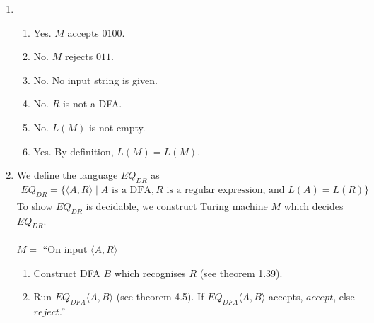 \documentclass[11pt]{article}
\begin{document}
\begin{enumerate}[label=4.\arabic*]
  \item
  \begin{enumerate}
    \item Yes. $M$ accepts $0100$.
    \item No. $M$ rejects $011$.
    \item No. No input string is given.
    \item No. $R$ is not a DFA.
    \item No. $L(M)$ is not empty.
    \item Yes. By definition, $L(M) = L(M)$.
  \end{enumerate}
  \item We define the language $EQ_{DR}$ as
    \begin{align*}
      EQ_{DR} = \{ \langle A, R \rangle \mid A \text{ is a DFA}, R \text{ is a regular expression, and } L(A) = L(R) \}
    \end{align*}
    To show $EQ_{DR}$ is decidable, we construct Turing machine $M$ which decides $EQ_{DR}$. \\\\
    $M =$ ``On input $\langle A, R \rangle$
    \begin{enumerate}[label=\arabic*.]
      \item Construct DFA $B$ which recognises $R$ (see theorem 1.39).
      \item Run $EQ_{DFA}\langle A, B \rangle$ (see theorem 4.5). If $EQ_{DFA}\langle A, B \rangle$ accepts, $accept$, else $reject$.''
    \end{enumerate}
\end{enumerate}
\end{document}
